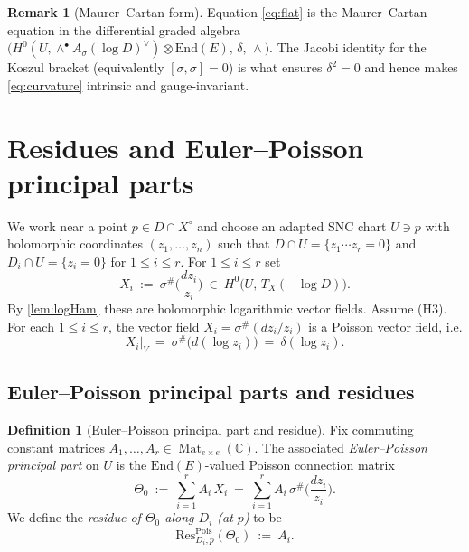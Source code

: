 \documentclass[11pt]{amsart}
\theoremstyle{plain}
\theoremstyle{definition}
\newtheorem{definition}[theorem]{Definition}
\newtheorem{remark}[theorem]{Remark}
\DeclareMathOperator{\Mat}{Mat}
\theoremstyle{definition}
\newcommand{\C}{\mathbb{C}}
\newcommand{\End}{\mathrm{End}}
\newcommand{\Res}{\mathrm{Res}}
\begin{document}
\begin{remark}[Maurer--Cartan form]\label{rem:MC}
Equation \eqref{eq:flat} is the Maurer--Cartan equation in the differential graded algebra
$\big( H^0(U,\wedge^\bullet A_\sigma(\log D)^\vee)\otimes \End(E),\,\delta,\,\wedge\big)$.
The Jacobi identity for the Koszul bracket (equivalently $[\sigma,\sigma]=0$) is what ensures $\delta^2=0$
and hence makes \eqref{eq:curvature} intrinsic and gauge-invariant.
\end{remark}




 
\section{Residues and Euler--Poisson principal parts}\label{sec:residues}
 

We work near a point $p\in D\cap X^\circ$ and choose an adapted SNC chart
$U\ni p$ with holomorphic coordinates $(z_1,\dots,z_n)$ such that
$D\cap U=\{z_1\cdots z_r=0\}$ and $D_i\cap U=\{z_i=0\}$ for $1\le i\le r$.
For $1\le i\le r$ set
$$
X_i \ :=\ \sigma^\# \Big(\frac{dz_i}{z_i}\Big)\ \in\ H^0\big(U,\,T_X(-\log D)\big).
$$
By \ref{lem:logHam} these are holomorphic logarithmic vector fields.
Assume \textup{(H3)}. For each $1\le i\le r$, the vector field
$X_i=\sigma^\#(dz_i/z_i)$ is a Poisson vector field, i.e.
\begin{equation}\label{lem:logHam-poisson}
X_i\big|_{V}\ =\ \sigma^\#\big(d(\log z_i)\big)\ =\ \delta(\log z_i).
\end{equation}


 

\subsection{Euler--Poisson principal parts and residues}

\begin{definition}[Euler--Poisson principal part and residue]\label{def:EP-residue}
Fix commuting constant matrices $A_1,\dots,A_r\in\Mat_{e\times e}(\C)$.
The associated \emph{Euler--Poisson principal part} on $U$ is the $\End(E)$-valued Poisson connection matrix
$$
\Theta_0\ :=\ \sum_{i=1}^r A_i\,X_i
\ =\ \sum_{i=1}^r A_i\,\sigma^\# \Big(\frac{dz_i}{z_i}\Big).
$$
We define the \emph{residue of $\Theta_0$ along $D_i$ (at $p$)} to be
$$
\Res^{\mathrm{Pois}}_{D_i,p}(\Theta_0)\ :=\ A_i.
$$
\end{definition}
\end{document}
